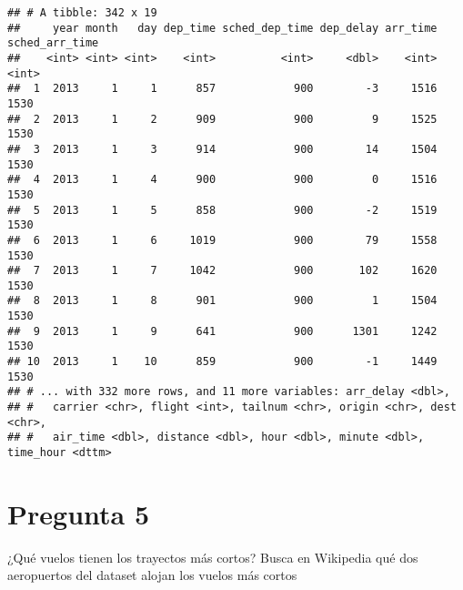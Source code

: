 \documentclass[
]{article}
\begin{document}
\begin{verbatim}
## # A tibble: 342 x 19
##     year month   day dep_time sched_dep_time dep_delay arr_time sched_arr_time
##    <int> <int> <int>    <int>          <int>     <dbl>    <int>          <int>
##  1  2013     1     1      857            900        -3     1516           1530
##  2  2013     1     2      909            900         9     1525           1530
##  3  2013     1     3      914            900        14     1504           1530
##  4  2013     1     4      900            900         0     1516           1530
##  5  2013     1     5      858            900        -2     1519           1530
##  6  2013     1     6     1019            900        79     1558           1530
##  7  2013     1     7     1042            900       102     1620           1530
##  8  2013     1     8      901            900         1     1504           1530
##  9  2013     1     9      641            900      1301     1242           1530
## 10  2013     1    10      859            900        -1     1449           1530
## # ... with 332 more rows, and 11 more variables: arr_delay <dbl>,
## #   carrier <chr>, flight <int>, tailnum <chr>, origin <chr>, dest <chr>,
## #   air_time <dbl>, distance <dbl>, hour <dbl>, minute <dbl>, time_hour <dttm>
\end{verbatim}

\hypertarget{pregunta-5}{%
\section{Pregunta 5}\label{pregunta-5}}

¿Qué vuelos tienen los trayectos más cortos? Busca en Wikipedia qué dos
aeropuertos del dataset alojan los vuelos más cortos
\end{document}
